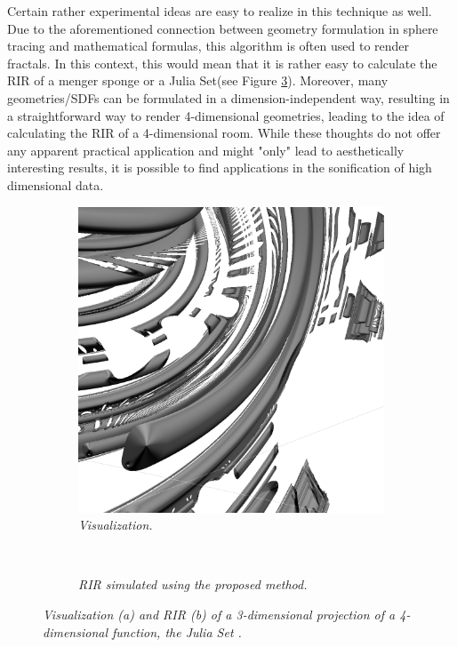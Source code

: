 \documentclass[twoside,a4paper]{article}
\begin{document}
Certain rather experimental ideas are easy to realize in this technique as well. Due to the aforementioned connection between geometry formulation in sphere tracing and mathematical formulas, this algorithm is often used to render fractals. In this context, this would mean that it is rather easy to calculate the RIR of a menger sponge or a Julia Set(see Figure \ref{fig:julia}). Moreover, many geometries/SDFs can be formulated in a dimension-independent way, resulting in a straightforward way to render 4-dimensional geometries, leading to the idea of calculating the RIR of a 4-dimensional room. While these thoughts do not offer any apparent practical application and might "only" lead to aesthetically interesting results, it is possible to find applications in the sonification of high dimensional data.

\begin{figure}[ht]
    \center
    \begin{subfigure}[t]{0.4\linewidth}
      \centering
      \includegraphics[width=1\linewidth]{img/julia.png}
    \caption{\label{fig:juliaRend} \it Visualization. }
    \end{subfigure} \

    \begin{subfigure}[t]{0.4\linewidth}
      \centering
      
      \caption{\label{fig:juliaRIR} \it RIR simulated using the proposed method. }
    \end{subfigure}
    \caption{\it Visualization (a) and RIR (b) of a 3-dimensional projection of a 4-dimensional function, the Julia Set \cite{quilez_inigo_nodate-1} .}
    \label{fig:julia}
\end{figure}
\end{document}
